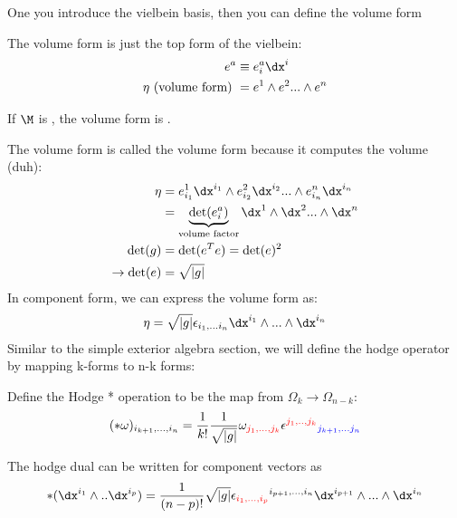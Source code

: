 \documentclass[11pt]{scrartcl}
\begin{document}
One you introduce the vielbein basis, then you can define the volume form
\begin{definition}
	The volume form is just the top form of the vielbein:
	\begin{align}
		e^a & \equiv e^a_{i} \dx^i \\
		\eta \text{ (volume form) }&= e^1 \wedge e^2 ... \wedge e^n
	\end{align}
\end{definition}
\begin{lemma}
	If $\M$ is , the volume form is .
\end{lemma}
The volume form is called the volume form because it computes the volume (duh):
\begin{align}
	\eta &= e^1_{i_1} \dx^{i_1} \wedge e^2_{i_2} \dx^{i_2} ... \wedge e^n_{i_n} \dx^{i_n} \\
	&= \underbrace{\text{det} (e^{a}_i)}_{\text{volume factor}} \dx^1 \wedge \dx^2 ... \wedge \dx^n \\
	\text{det}(g) &= \text{det}(e^T e) = \text{det}(e)^2 \\
	\rightarrow \text{det}(e) &= \sqrt{|g|}
\end{align}
In component form, we can express the volume form as:
\begin{align}
	\eta = \sqrt{|g|} \epsilon_{i_1, ... i_n} \dx^{i_1} \wedge ... \wedge \dx^{i_n}
\end{align}
Similar to the simple exterior algebra section, we will define the hodge operator by mapping k-forms to n-k forms:
\begin{definition}
	Define the Hodge * operation to be the map from $\Omega_k \rightarrow \Omega_{n-k}$:
	\begin{align}
		(*\omega)_{i_{k+1}, ..., i_{n}} = {1 \over k!} {1 \over \sqrt{|g|}} \omega_{\color{red} j_1, ..., j_k} \epsilon^{\color{red}j_1, .., j_{k}}_{\color{blue} j_{k+1},... j_n}
	\end{align}
\end{definition}

\begin{lemma}
	The hodge dual can be written for component vectors as
	\begin{align}
		*(\dx^{i_1} \wedge .. \dx^{i_p}) = {1 \over (n-p)!}  \sqrt{|g|} \epsilon_{\color{red} i_1, ..., i_p}^{i_{p+1}, ..., i_n} \dx^{i_{p+1}} \wedge ... \wedge \dx^{i_{n}} 
	\end{align}
\end{lemma}
\end{document}

